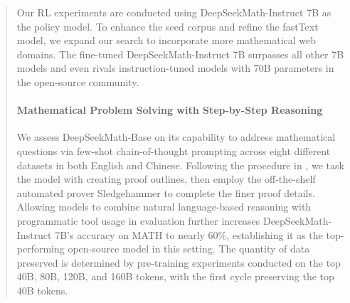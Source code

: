 \begin{abstract}
\begin{itemize}[topsep=0pt]
\begin{itemize}[topsep=0pt]
\begin{itemize}[topsep=0pt]
\begin{itemize}[topsep=0pt]
Our RL experiments are conducted using DeepSeekMath-Instruct 7B as the policy model. To enhance the seed corpus and refine the fastText model, we expand our search to incorporate more mathematical web domains. The fine-tuned DeepSeekMath-Instruct 7B surpasses all other 7B models and even rivals instruction-tuned models with 70B parameters in the open-source community. \paragraph{Mathematical Problem Solving with Step-by-Step Reasoning}

We assess DeepSeekMath-Base on its capability to address mathematical questions via few-shot chain-of-thought prompting \citep{cot} across eight different datasets in both English and Chinese. Following the procedure in \cite{dsp_proof}, we task the model with creating proof outlines, then employ the off-the-shelf automated prover Sledgehammer \citep{sledgehammer} to complete the finer proof details. Allowing models to combine natural language-based reasoning with programmatic tool usage in evaluation further increases DeepSeekMath-Instruct 7B’s accuracy on MATH to nearly 60\%, establishing it as the top-performing open-source model in this setting. The quantity of data preserved is determined by pre-training experiments conducted on the top 40B, 80B, 120B, and 160B tokens, with the first cycle preserving the top 40B tokens. \end{itemize}


\end{itemize}
\end{itemize}
\end{itemize}
\end{abstract}
